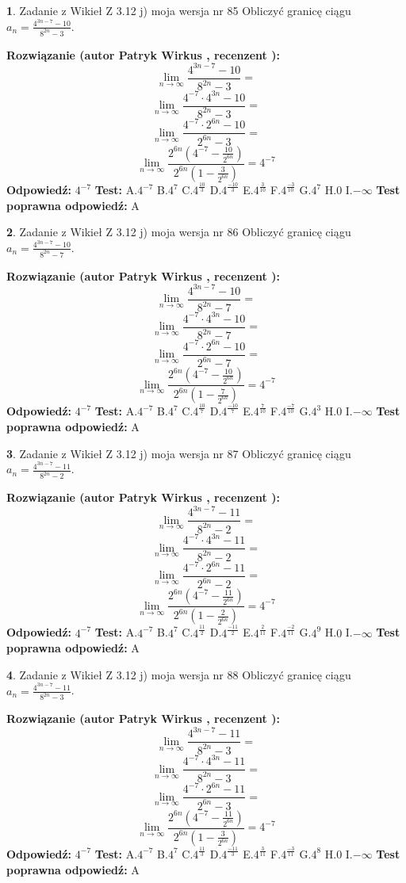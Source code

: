 \documentclass[12pt, a4paper]{article}
\theoremstyle{definition} %
\newtheorem{zad}{}
\newcommand{\zadStart}[1]{\begin{zad}#1\newline}
\newcommand{\zadStop}{\end{zad}}
\newcommand{\rozwStart}[2]{\noindent \textbf{Rozwiązanie (autor #1 , recenzent #2): }\newline}
\newcommand{\rozwStop}{\newline}
\newcommand{\odpStart}{\noindent \textbf{Odpowiedź:}\newline}
\newcommand{\odpStop}{\newline}
\newcommand{\testStart}{\noindent \textbf{Test:}\newline}
\newcommand{\testStop}{\newline}
\newcommand{\kluczStart}{\noindent \textbf{Test poprawna odpowiedź:}\newline}
\newcommand{\kluczStop}{\newline}
\begin{document}
\zadStart{Zadanie z Wikieł Z 3.12 j) moja wersja nr 85}
Obliczyć granicę ciągu $a_{n}=\frac{4^{3n-7}-10}{8^{2n}-3}$.
\zadStop
\rozwStart{Patryk Wirkus}{}
$$\lim\limits_{n\to\infty}\frac{4^{3n-7}-10}{8^{2n}-3}=$$
$$\lim\limits_{n\to\infty}\frac{4^{-7} \cdot 4^{3n}-10}{8^{2n}-3}=$$
$$\lim\limits_{n\to\infty}\frac{4^{-7} \cdot 2^{6n}-10}{2^{6n}-3}=$$
$$\lim\limits_{n\to\infty}\frac{2^{6n}(4^{-7} - \frac{10}{2^{6n}})}{2^{6n}(1-\frac{3}{2^{6n}})}= 4^{-7}$$
\rozwStop
\odpStart
$4^{-7}$
\odpStop
\testStart
A.$4^{-7}$
B.$4^{7}$
C.$4^{\frac{10}{3}}$
D.$4^{\frac{-10}{3}}$
E.$4^{\frac{3}{10}}$
F.$4^{\frac{-3}{10}}$
G.$4^{7}$
H.$0$
I.$-\infty$
\testStop
\kluczStart
A
\kluczStop



\zadStart{Zadanie z Wikieł Z 3.12 j) moja wersja nr 86}
Obliczyć granicę ciągu $a_{n}=\frac{4^{3n-7}-10}{8^{2n}-7}$.
\zadStop
\rozwStart{Patryk Wirkus}{}
$$\lim\limits_{n\to\infty}\frac{4^{3n-7}-10}{8^{2n}-7}=$$
$$\lim\limits_{n\to\infty}\frac{4^{-7} \cdot 4^{3n}-10}{8^{2n}-7}=$$
$$\lim\limits_{n\to\infty}\frac{4^{-7} \cdot 2^{6n}-10}{2^{6n}-7}=$$
$$\lim\limits_{n\to\infty}\frac{2^{6n}(4^{-7} - \frac{10}{2^{6n}})}{2^{6n}(1-\frac{7}{2^{6n}})}= 4^{-7}$$
\rozwStop
\odpStart
$4^{-7}$
\odpStop
\testStart
A.$4^{-7}$
B.$4^{7}$
C.$4^{\frac{10}{7}}$
D.$4^{\frac{-10}{7}}$
E.$4^{\frac{7}{10}}$
F.$4^{\frac{-7}{10}}$
G.$4^{3}$
H.$0$
I.$-\infty$
\testStop
\kluczStart
A
\kluczStop



\zadStart{Zadanie z Wikieł Z 3.12 j) moja wersja nr 87}
Obliczyć granicę ciągu $a_{n}=\frac{4^{3n-7}-11}{8^{2n}-2}$.
\zadStop
\rozwStart{Patryk Wirkus}{}
$$\lim\limits_{n\to\infty}\frac{4^{3n-7}-11}{8^{2n}-2}=$$
$$\lim\limits_{n\to\infty}\frac{4^{-7} \cdot 4^{3n}-11}{8^{2n}-2}=$$
$$\lim\limits_{n\to\infty}\frac{4^{-7} \cdot 2^{6n}-11}{2^{6n}-2}=$$
$$\lim\limits_{n\to\infty}\frac{2^{6n}(4^{-7} - \frac{11}{2^{6n}})}{2^{6n}(1-\frac{2}{2^{6n}})}= 4^{-7}$$
\rozwStop
\odpStart
$4^{-7}$
\odpStop
\testStart
A.$4^{-7}$
B.$4^{7}$
C.$4^{\frac{11}{2}}$
D.$4^{\frac{-11}{2}}$
E.$4^{\frac{2}{11}}$
F.$4^{\frac{-2}{11}}$
G.$4^{9}$
H.$0$
I.$-\infty$
\testStop
\kluczStart
A
\kluczStop



\zadStart{Zadanie z Wikieł Z 3.12 j) moja wersja nr 88}
Obliczyć granicę ciągu $a_{n}=\frac{4^{3n-7}-11}{8^{2n}-3}$.
\zadStop
\rozwStart{Patryk Wirkus}{}
$$\lim\limits_{n\to\infty}\frac{4^{3n-7}-11}{8^{2n}-3}=$$
$$\lim\limits_{n\to\infty}\frac{4^{-7} \cdot 4^{3n}-11}{8^{2n}-3}=$$
$$\lim\limits_{n\to\infty}\frac{4^{-7} \cdot 2^{6n}-11}{2^{6n}-3}=$$
$$\lim\limits_{n\to\infty}\frac{2^{6n}(4^{-7} - \frac{11}{2^{6n}})}{2^{6n}(1-\frac{3}{2^{6n}})}= 4^{-7}$$
\rozwStop
\odpStart
$4^{-7}$
\odpStop
\testStart
A.$4^{-7}$
B.$4^{7}$
C.$4^{\frac{11}{3}}$
D.$4^{\frac{-11}{3}}$
E.$4^{\frac{3}{11}}$
F.$4^{\frac{-3}{11}}$
G.$4^{8}$
H.$0$
I.$-\infty$
\testStop
\kluczStart
A
\kluczStop
\end{document}
